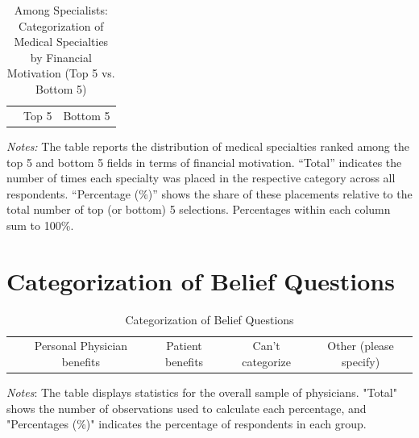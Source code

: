 \documentclass[11pt]{article}
\theoremstyle{definition}
\begin{document}
\begin{table}[H]
    \centering
    \caption{Among Specialists: Categorization of Medical Specialties by Financial Motivation (Top 5 vs. Bottom 5)}
    \begin{adjustbox}{width=0.55\linewidth} 
    \begin{tabular}{lcccc}\toprule & \multicolumn{2}{c}{Top 5} & \multicolumn{2}{c}{Bottom 5} \\ \cmidrule(lr){2-3} \cmidrule(lr){4-5} 
    
    \end{tabular}
    \end{adjustbox}
    \label{tab:med_field_cat_finmov_sp}
          {\parbox{1\linewidth}{           %
		\scriptsize{{{ \textit{Notes:} The table reports the distribution of medical specialties ranked among the top 5 and bottom 5 fields in terms of financial motivation. “Total” indicates the number of times each specialty was placed in the respective category across all respondents. “Percentage (\%)” shows the share of these placements relative to the total number of top (or bottom) 5 selections. Percentages within each column sum to 100\%.}}}}}
\end{table}

\section{Categorization of Belief Questions} 

\begin{table}[H]
    \centering
    \caption{Categorization of Belief Questions}
        \begin{adjustbox}{width=0.95\linewidth} 
    \begin{tabular}{lcccccccc}\toprule & \multicolumn{2}{c}{Personal Physician benefits} & \multicolumn{2}{c}{Patient benefits} & \multicolumn{2}{c}{Can't categorize} & \multicolumn{2}{c}{Other (please specify)} \\ \cmidrule(lr){2-3} \cmidrule(lr){4-5} \cmidrule(lr){6-7} \cmidrule(lr){8-9} 

    \end{tabular}
\end{adjustbox}
     \parbox{\linewidth}{
        	\vspace{.2cm}
        		\scriptsize{\scriptsize{{\emph{Notes}: The table displays statistics for the overall sample of physicians. "Total" shows the number of observations used to calculate each percentage, and "Percentages (\%)" indicates the percentage of respondents in each group.}}}}
    \label{tab:ai_table}
\end{table}
\end{document}
